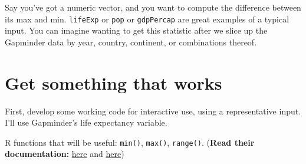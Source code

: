 \documentclass[
]{book}
\newenvironment{Shaded}{\begin{snugshade}}{\end{snugshade}}
\newcommand{\CommentTok}[1]{\textcolor[rgb]{0.56,0.35,0.01}{\textit{#1}}}
\newcommand{\DecValTok}[1]{\textcolor[rgb]{0.00,0.00,0.81}{#1}}
\newcommand{\KeywordTok}[1]{\textcolor[rgb]{0.13,0.29,0.53}{\textbf{#1}}}
\newcommand{\NormalTok}[1]{#1}
\newcommand{\OperatorTok}[1]{\textcolor[rgb]{0.81,0.36,0.00}{\textbf{#1}}}
\newcommand{\StringTok}[1]{\textcolor[rgb]{0.31,0.60,0.02}{#1}}
\begin{document}
Say you've got a numeric vector, and you want to compute the difference between its max and min. \texttt{lifeExp} or \texttt{pop} or \texttt{gdpPercap} are great examples of a typical input. You can imagine wanting to get this statistic after we slice up the Gapminder data by year, country, continent, or combinations thereof.

\hypertarget{get-something-that-works}{%
\section{Get something that works}\label{get-something-that-works}}

First, develop some working code for interactive use, using a representative input. I'll use Gapminder's life expectancy variable.

R functions that will be useful: \texttt{min()}, \texttt{max()}, \texttt{range()}. (\textbf{Read their documentation:} \href{https://rdrr.io/r/base/Extremes.html}{here} and \href{https://rdrr.io/r/base/range.html}{here})

\begin{Shaded}
\end{Shaded}
\end{document}
